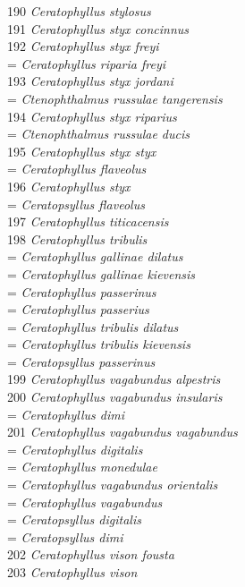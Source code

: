 \documentclass[
]{article}
\begin{document}
190 \emph{Ceratophyllus stylosus}\\
191 \emph{Ceratophyllus styx concinnus}\\
192 \emph{Ceratophyllus styx freyi}\\
= \emph{Ceratophyllus riparia freyi}\\
193 \emph{Ceratophyllus styx jordani}\\
= \emph{Ctenophthalmus russulae tangerensis}\\
194 \emph{Ceratophyllus styx riparius}\\
= \emph{Ctenophthalmus russulae ducis}\\
195 \emph{Ceratophyllus styx styx}\\
= \emph{Ceratophyllus flaveolus}\\
196 \emph{Ceratophyllus styx}\\
= \emph{Ceratopsyllus flaveolus}\\
197 \emph{Ceratophyllus titicacensis}\\
198 \emph{Ceratophyllus tribulis}\\
= \emph{Ceratophyllus gallinae dilatus}\\
= \emph{Ceratophyllus gallinae kievensis}\\
= \emph{Ceratophyllus passerinus}\\
= \emph{Ceratophyllus passerius}\\
= \emph{Ceratophyllus tribulis dilatus}\\
= \emph{Ceratophyllus tribulis kievensis}\\
= \emph{Ceratopsyllus passerinus}\\
199 \emph{Ceratophyllus vagabundus alpestris}\\
200 \emph{Ceratophyllus vagabundus insularis}\\
= \emph{Ceratophyllus dimi}\\
201 \emph{Ceratophyllus vagabundus vagabundus}\\
= \emph{Ceratophyllus digitalis}\\
= \emph{Ceratophyllus monedulae}\\
= \emph{Ceratophyllus vagabundus orientalis}\\
= \emph{Ceratophyllus vagabundus}\\
= \emph{Ceratopsyllus digitalis}\\
= \emph{Ceratopsyllus dimi}\\
202 \emph{Ceratophyllus vison fousta}\\
203 \emph{Ceratophyllus vison}\\
\end{document}

